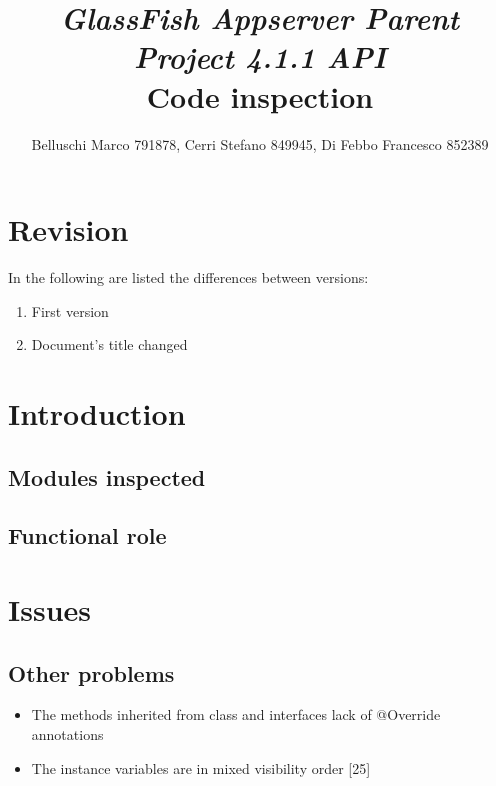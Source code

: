 \documentclass[]{report}
\begin{document}
	
\title{{\Huge\textit{GlassFish Appserver Parent Project 4.1.1 API}}\\{\Large Code inspection}}
\author{Belluschi Marco 791878, Cerri Stefano 849945, Di Febbo Francesco 852389}

\maketitle

\chapter*{Revision}
In the following are listed the differences between versions:
\begin{enumerate}
	\item First version
	\item Document's title changed
\end{enumerate}

\tableofcontents

\chapter{Introduction}

\section{Modules inspected}


\section{Functional role}


\chapter{Issues}




\section*{Other problems}
\begin{itemize}
	\item The methods inherited from class and interfaces lack of @Override annotations
	\item The instance variables are in mixed visibility order [25]
\end{itemize}
\end{document}
